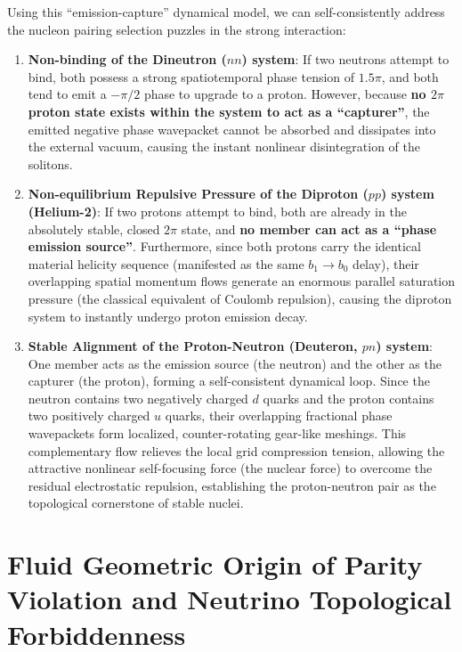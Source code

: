 \documentclass[12pt, a4paper]{article}
\begin{document}
Using this ``emission-capture'' dynamical model, we can self-consistently address the nucleon pairing selection puzzles in the strong interaction:
\begin{enumerate}
    \item \textbf{Non-binding of the Dineutron ($nn$) system}: If two neutrons attempt to bind, both possess a strong spatiotemporal phase tension of $1.5\pi$, and both tend to emit a $-\pi/2$ phase to upgrade to a proton. However, because \textbf{no $2\pi$ proton state exists within the system to act as a ``capturer''}, the emitted negative phase wavepacket cannot be absorbed and dissipates into the external vacuum, causing the instant nonlinear disintegration of the solitons.
    
    \item \textbf{Non-equilibrium Repulsive Pressure of the Diproton ($pp$) system (Helium-2)}: If two protons attempt to bind, both are already in the absolutely stable, closed $2\pi$ state, and \textbf{no member can act as a ``phase emission source''}. Furthermore, since both protons carry the identical material helicity sequence (manifested as the same $b_1 \to b_0$ delay), their overlapping spatial momentum flows generate an enormous parallel saturation pressure (the classical equivalent of Coulomb repulsion), causing the diproton system to instantly undergo proton emission decay.
    
    \item \textbf{Stable Alignment of the Proton-Neutron (Deuteron, $pn$) system}: One member acts as the emission source (the neutron) and the other as the capturer (the proton), forming a self-consistent dynamical loop. Since the neutron contains two negatively charged $d$ quarks and the proton contains two positively charged $u$ quarks, their overlapping fractional phase wavepackets form localized, counter-rotating gear-like meshings. This complementary flow relieves the local grid compression tension, allowing the attractive nonlinear self-focusing force (the nuclear force) to overcome the residual electrostatic repulsion, establishing the proton-neutron pair as the topological cornerstone of stable nuclei.
\end{enumerate}

\section{Fluid Geometric Origin of Parity Violation and Neutrino Topological Forbiddenness}
\end{document}
